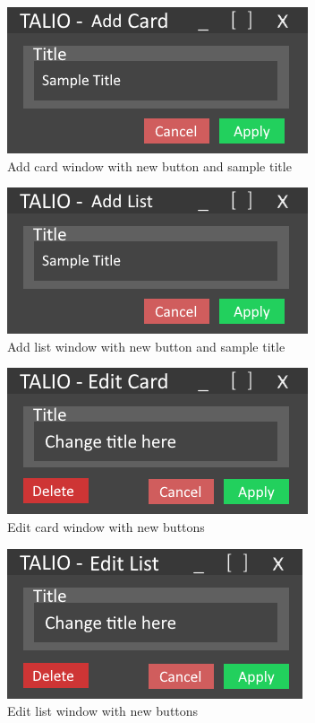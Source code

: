 \begin{figure}
    \centering
    \includegraphics{images/UI design addCard.png}
    \caption{Add card window with new button and sample title}
    \label{fig:addCardWindow}
\end{figure}
\begin{figure}
    \centering
    \includegraphics{images/UI design addList.png}
    \caption{Add list window with new button and sample title}
    \label{fig:addListWindow}
\end{figure}
\begin{figure}
    \centering
    \includegraphics{images/UI design editCard.png}
    \caption{Edit card window with new buttons}
    \label{fig:editCardWindow}
\end{figure}
\begin{figure}
    \centering
    \includegraphics{images/UI design editList.png}
    \caption{Edit list window with new buttons}
    \label{fig:editListwindow}
\end{figure}